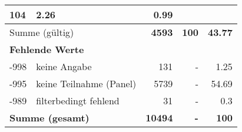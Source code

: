 \begin{longtable}{lXrrr}
       \num{104} &
       \num[round-mode=places,round-precision=2]{2,26} &
         \num[round-mode=places,round-precision=2]{0,99} \\
     \midrule
     \multicolumn{2}{l}{Summe (gültig)} &
       \textbf{\num{4593}} &
     \textbf{100} &
       \textbf{\num[round-mode=places,round-precision=2]{43,77}} \\
     \multicolumn{5}{l}{\textbf{Fehlende Werte}}\\
       -998 &
       keine Angabe &
         \num{131} &
        - &
         \num[round-mode=places,round-precision=2]{1,25} \\
       -995 &
       keine Teilnahme (Panel) &
         \num{5739} &
        - &
         \num[round-mode=places,round-precision=2]{54,69} \\
       -989 &
       filterbedingt fehlend &
         \num{31} &
        - &
         \num[round-mode=places,round-precision=2]{0,3} \\
     \midrule
     \multicolumn{2}{l}{\textbf{Summe (gesamt)}} &
          \textbf{\num{10494}} &
        \textbf{-} &
        \textbf{100} \\
     \bottomrule
     \end{longtable}
     
